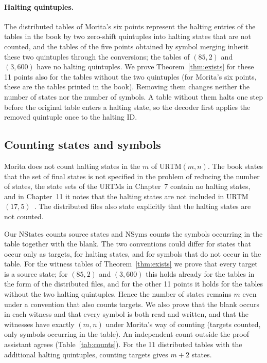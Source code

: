 \documentclass{article}
\theoremstyle{definition}
\theoremstyle{remark}
\begin{document}
\paragraph{Halting quintuples.}
The distributed tables of Morita's six points represent the halting entries of the tables in the book by two zero-shift quintuples into halting states that are not counted, and the tables of the five points obtained by symbol merging inherit these two quintuples through the conversions; the tables of $(85,2)$ and $(3,600)$ have no halting quintuples.
We prove Theorem~\ref{thm:exists} for these 11 points also for the tables without the two quintuples (for Morita's six points, these are the tables printed in the book).
Removing them changes neither the number of states nor the number of symbols. A table without them halts one step before the original table enters a halting state, so the decoder first applies the removed quintuple once to the halting ID.

\subsection{Counting states and symbols}
\label{sec:counting}

Morita does not count halting states in the $m$ of URTM$(m,n)$.
The book states that the set of final states is not specified in the problem of reducing the number of states, the state sets of the URTMs in Chapter~7 contain no halting states, and in Chapter~11 it notes that the halting states are not included in URTM$(17,5)$~\cite{Morita17}.
The distributed files also state explicitly that the halting states are not counted.

Our $\mathrm{NStates}$ counts source states and $\mathrm{NSyms}$ counts the symbols occurring in the table together with the blank.
The two conventions could differ for states that occur only as targets, for halting states, and for symbols that do not occur in the table.
For the witness tables of Theorem~\ref{thm:exists} we prove that every target is a source state; for $(85,2)$ and $(3,600)$ this holds already for the tables in the form of the distributed files, and for the other 11 points it holds for the tables without the two halting quintuples.
Hence the number of states remains $m$ even under a convention that also counts targets.
We also prove that the blank occurs in each witness and that every symbol is both read and written, and that the witnesses have exactly $(m,n)$ under Morita's way of counting (targets counted, only symbols occurring in the table).
An independent count outside the proof assistant agrees (Table~\ref{tab:counts}).
For the 11 distributed tables with the additional halting quintuples, counting targets gives $m+2$ states.
\end{document}
